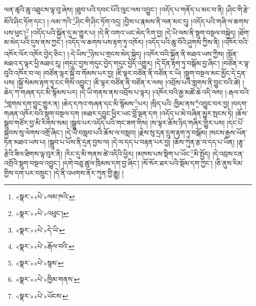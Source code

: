 ལན་ཚྭའི་ཆུ་འཐུངས་ལྟ་བུ་ཞེས། །ཐུབ་པའི་དབང་པོའི་ལུང་ལས་འབྱུང་། །འདོད་པ་གནོད་པ་མང་བ་ནི། །ཤིང་གི་རྩེ་མོའི་ཤིང་ཏོག་དང་། །:ལམ་ཀའི་\footnote{«སྣར་»«པེ་»ལམ་ཁའི་}ཤིང་གི་ཤིང་ཏོག་འདྲ། །བྱིས་པ་རྣམས་ནི་ལན་མང་དུ། །འདོད་པའི་གཞི་ལ་ཆགས་པས་ཕུང་།\footnote{«སྣར་»«པེ་»འཕུང་།} །འདོད་པའི་སྐྱོན་དུ་མ་གྱུར་པ། །དེ་ནི་འགའ་ཡང་མེད་རིག་བྱ། །དེ་ཡི་ལས་ནི་སྡུག་བསྔལ་བསྐྱེད། །ཐོག་མ་མེད་པའི་དུས་ནས་ཀྱང་། །འདོད་ལ་ཆགས་པས་རྟག་ཏུ་འཁོར། །འདོད་པའི་ཆུ་བོའི་ཤུགས་ཀྱིས་ནི། །འཁོར་བའི་འཁོར་ལོར་འཁོར་བྱེད་ཅིང་། །:དེ་ཡིས་\footnote{«སྣར་»«པེ་»དེ་ཡི་}ཉེས་པ་གྲངས་མེད་སྐྱེད། །འཁོར་བའི་སྐྱོན་ནི་མཐའ་ཡས་ཀྱིས། །སྔོན་མཐའ་ད་ལྟར་ཕྱི་མཐའ་རུ། །གདུང་བྱས་གདུང་བྱེད་གདུང་བྱེད་འགྱུར། །དེ་དོན་རྟག་ཏུ་བསྒོམ་བྱ་ཞིང་། །བཙོན་ར་ལྟ་བུའི་འཁོར་བ་ལ། །བཙོན་ལྟར་སྐྱོ་བ་གོམས་པར་བྱ། །ཇི་ལྟར་བཙོན་ནི་བཙོན་ར་ཡི། །སྡུག་བསྔལ་མང་མྱོང་དེ་དྲན་པས། །སྐྱོ་སེམས་རྟག་ཏུ་ངང་གིས་འབྱུང་། །ཇི་ལྟར་བཙོན་ནི་བཙོན་ར་ལས། །འབྲོས་པའི་གླགས་ནི་བྱུང་བའི་ཚེ། །ཆེད་ཀ་གཞན་དང་མི་སྙོམས་པར། །དེ་ཡི་གནས་ནས་འབྲོས་པ་ལྟར། །འཁོར་བའི་རྒྱ་མཚོ་ཆེ་འདི་ལས། །:རྒལ་བའི་\footnote{«སྣར་»«པེ་»རྒོལ་བའི་}གླགས་དག་བྱུང་གྱུར་ན། །ཆེད་དཀའ་གཞན་དང་མི་སྙོམས་\footnote{«སྣར་»«པེ་»སྙམ་}པར། །སྲིད་པའི་:ཁྱིམ་ནས་\footnote{«སྣར་»«པེ་»ཁྱིམ་གནས་}འབྱུང་བར་བྱ། །བདག་གཞན་འཁོར་བའི་སྡུག་བསྔལ་དག །མཐར་དབྱུང་ཕྱིར་ཡང་བློ་ལྡན་དག །འདོད་པ་མེ་བཞིན་མྱུར་སྤངས་ཏེ། །ཆོས་སྒྲུབ་གཙོར་བྱ་མི་རིགས་སམ། །སྒྲུབ་པར་འདོད་པའི་གང་ཟག་གིས། །ས་ལྟར་ཆོས་ཉིད་གཞིར་གྱུར་པས། །དང་པོ་སྐྱབས་སུ་ལེགས་འགྲོ་ཞིང་། །དེ་ཡི་བསླབ་པའི་ཆོས་ལ་བསླབ། །རྗེས་སུ་དྲན་དྲུག་རྟག་ཏུ་བསྒོམ། །སངས་རྒྱས་ཡོན་ཏན་མཐའ་ཡས་པ། །སྒྲུབ་པ་པོས་ནི་དྲན་བྱས་ལ། །དེ་ལ་དད་པ་བརྟན་པར་བྱ། །ཆོས་ཀུན་རྩ་བ་དད་པ་ཡིན། །རྩྭ་རྩེའི་ཟིལ་ཐིགས་ལྟ་བུར་ནི། །རིང་དུ་མི་གནས་ཚེ་འདིའི་ཕྱིར། །མཁས་པས་སྡིག་པ་ཡོང་\footnote{«སྣར་»«པེ་»ཡོངས་}མི་སྤྱོད། །དེ་འབྲས་ངན་འགྲོའི་སྡུག་བསྔལ་འབྱུང་། །དགེ་བཅུ་ཚུལ་ཁྲིམས་དག་བྱ་ཞིང་། །སོ་སོར་ཐར་པའི་སྡོམ་དག་ཀྱང་། །ཅི་ནུས་རིམ་གྱིས་དག་པར་བསྲུང་། །དེ་ནི་འཕགས་ནོར་ཀུན་གྱི་རྒྱུ། །
